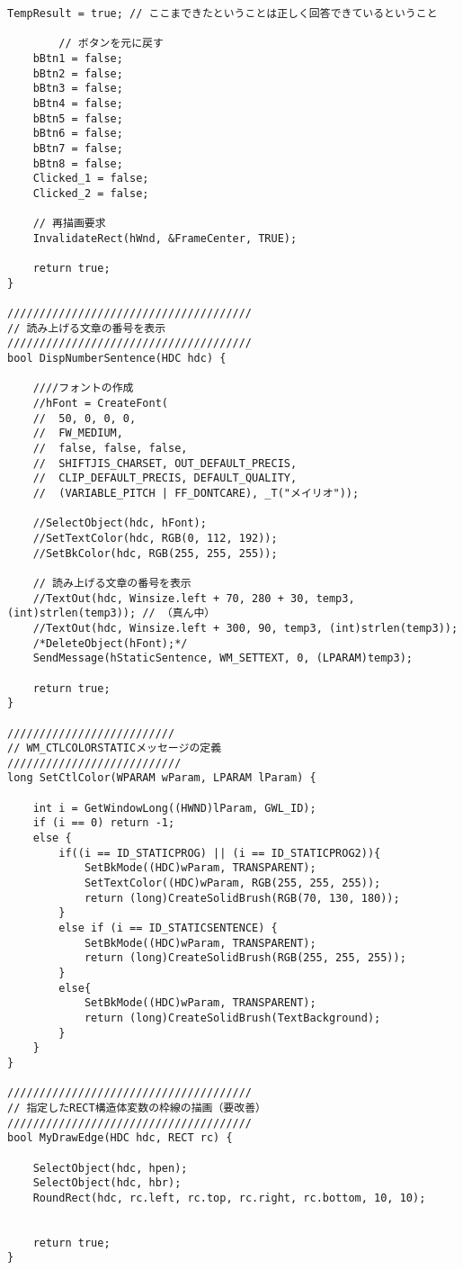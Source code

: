 \begin{lstlisting}[caption=main.cpp]
	TempResult = true; // ここまできたということは正しく回答できているということ

		// ボタンを元に戻す
	bBtn1 = false;
	bBtn2 = false;
	bBtn3 = false;
	bBtn4 = false;
	bBtn5 = false;
	bBtn6 = false;
	bBtn7 = false;
	bBtn8 = false;
	Clicked_1 = false;
	Clicked_2 = false;

	// 再描画要求
	InvalidateRect(hWnd, &FrameCenter, TRUE);

	return true;
}

//////////////////////////////////////
// 読み上げる文章の番号を表示
//////////////////////////////////////
bool DispNumberSentence(HDC hdc) {

	////フォントの作成
	//hFont = CreateFont(
	//	50, 0, 0, 0,
	//	FW_MEDIUM,
	//	false, false, false,
	//	SHIFTJIS_CHARSET, OUT_DEFAULT_PRECIS,
	//	CLIP_DEFAULT_PRECIS, DEFAULT_QUALITY,
	//	(VARIABLE_PITCH | FF_DONTCARE), _T("メイリオ"));

	//SelectObject(hdc, hFont);
	//SetTextColor(hdc, RGB(0, 112, 192));
	//SetBkColor(hdc, RGB(255, 255, 255));
	
	// 読み上げる文章の番号を表示
	//TextOut(hdc, Winsize.left + 70, 280 + 30, temp3, (int)strlen(temp3)); // （真ん中）
	//TextOut(hdc, Winsize.left + 300, 90, temp3, (int)strlen(temp3));
	/*DeleteObject(hFont);*/
	SendMessage(hStaticSentence, WM_SETTEXT, 0, (LPARAM)temp3);

	return true;
}

//////////////////////////
// WM_CTLCOLORSTATICメッセージの定義
///////////////////////////
long SetCtlColor(WPARAM wParam, LPARAM lParam) {

	int i = GetWindowLong((HWND)lParam, GWL_ID);
	if (i == 0) return -1;
	else {
		if((i == ID_STATICPROG) || (i == ID_STATICPROG2)){
			SetBkMode((HDC)wParam, TRANSPARENT);
			SetTextColor((HDC)wParam, RGB(255, 255, 255));
			return (long)CreateSolidBrush(RGB(70, 130, 180));
		}
		else if (i == ID_STATICSENTENCE) {
			SetBkMode((HDC)wParam, TRANSPARENT);
			return (long)CreateSolidBrush(RGB(255, 255, 255));
		}
		else{
			SetBkMode((HDC)wParam, TRANSPARENT);
			return (long)CreateSolidBrush(TextBackground);
		}	
	}
}

//////////////////////////////////////
// 指定したRECT構造体変数の枠線の描画（要改善）
//////////////////////////////////////
bool MyDrawEdge(HDC hdc, RECT rc) {
	
	SelectObject(hdc, hpen);
	SelectObject(hdc, hbr);
	RoundRect(hdc, rc.left, rc.top, rc.right, rc.bottom, 10, 10);
	

	return true;
}


\end{lstlisting}
